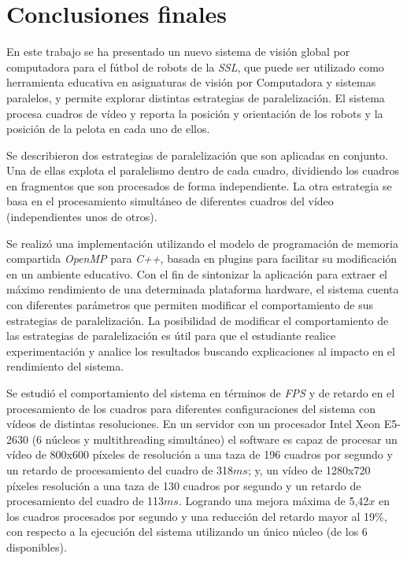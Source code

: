 
\section{Conclusiones finales}

\label{concluciones}

En este trabajo se ha presentado un nuevo sistema de visión global por
computadora para el fútbol de robots de la \emph{SSL}, que puede ser utilizado
como herramienta educativa en asignaturas de visión por Computadora y sistemas
paralelos, y permite explorar distintas estrategias de paralelización. El
sistema procesa cuadros de vídeo y reporta la posición y orientación de los
robots y la posición de la pelota en cada uno de ellos.

Se describieron dos estrategias de paralelización que son aplicadas en conjunto.
Una de ellas explota el paralelismo dentro de cada cuadro, dividiendo los
cuadros en fragmentos que son procesados de forma independiente. La otra
estrategia se basa en el procesamiento simultáneo de diferentes cuadros del
vídeo (independientes unos de otros).

Se realizó una implementación utilizando el modelo de programación de memoria
compartida \emph{OpenMP} para \emph{C++}, basada en plugins para facilitar su
modificación en un ambiente educativo. Con el fin de sintonizar la aplicación
para extraer el máximo rendimiento de una determinada plataforma hardware, el
sistema cuenta con diferentes parámetros que permiten modificar el
comportamiento de sus estrategias de paralelización. La posibilidad de modificar
el comportamiento de las estrategias de paralelización es útil para que el
estudiante realice experimentación y analice los resultados buscando
explicaciones al impacto en el rendimiento del sistema.

Se estudió el comportamiento del sistema en términos de \emph{FPS} y de retardo
en el procesamiento de los cuadros para diferentes configuraciones del sistema
con vídeos de distintas resoluciones. En un servidor con un procesador Intel
Xeon E5-2630 (6 núcleos y multithreading simultáneo) el software es capaz de
procesar un vídeo de 800x600 píxeles de resolución a una taza de 196 cuadros por
segundo y un retardo de procesamiento del cuadro de 318$ms$; y, un vídeo de
1280x720 píxeles resolución a una taza de 130 cuadros por segundo y un retardo
de procesamiento del cuadro de 113$ms$. Logrando una mejora máxima de 5,42$x$ en
los cuadros procesados por segundo y una reducción del retardo mayor al 19\%,
con respecto a la ejecución del sistema utilizando un único núcleo (de los 6
disponibles).

